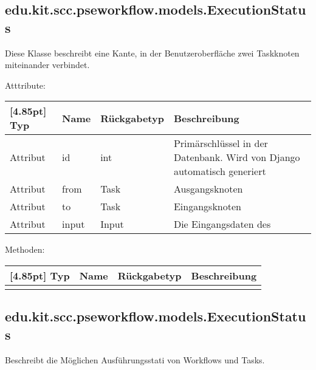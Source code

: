         \subsection{edu.kit.scc.pseworkflow.models.ExecutionStatus}	
    			Diese Klasse beschreibt eine Kante, in der Benutzeroberfläche zwei Taskknoten miteinander verbindet. 
    			
    			Atttribute:
    			\begin{center}
    				\setlength\tabcolsep{5pt}
    				\renewcommand{\arraystretch}{1.5}
    				
    				\begin{tabularx}{\textwidth}{|l|l|l|X|}
    					\hline
    					\rowcolor[gray]{0.75}[4.85pt]
    					Typ & Name & Rückgabetyp & Beschreibung \\ \hline 
    	           		Attribut & id & int & Primärschlüssel in der Datenbank. Wird von Django automatisch generiert \\ \hline
    	           		Attribut & from & Task & Ausgangsknoten \\ \hline
    	           		Attribut & to & Task & Eingangsknoten \\ \hline
    	           		Attribut & input & Input & Die Eingangsdaten des \\
    	           		
    	           		\hline
    				\end{tabularx}
    			\end{center}
    			
    			Methoden:
    			\begin{center}
    				\setlength\tabcolsep{5pt}
    				\renewcommand{\arraystretch}{1.5}
    				
    				\begin{tabularx}{\textwidth}{|l|l|l|X|}
    					\hline
    					\rowcolor[gray]{0.75}[4.85pt]
    					Typ & Name & Rückgabetyp & Beschreibung \\ \hline
    					&&& \\ 
    					\hline
    				\end{tabularx}
    			\end{center}
    			
    			
    
    
		\subsection{edu.kit.scc.pseworkflow.models.ExecutionStatus}	
			Beschreibt die Möglichen Ausführungsstati von Workflows und Tasks.
			

